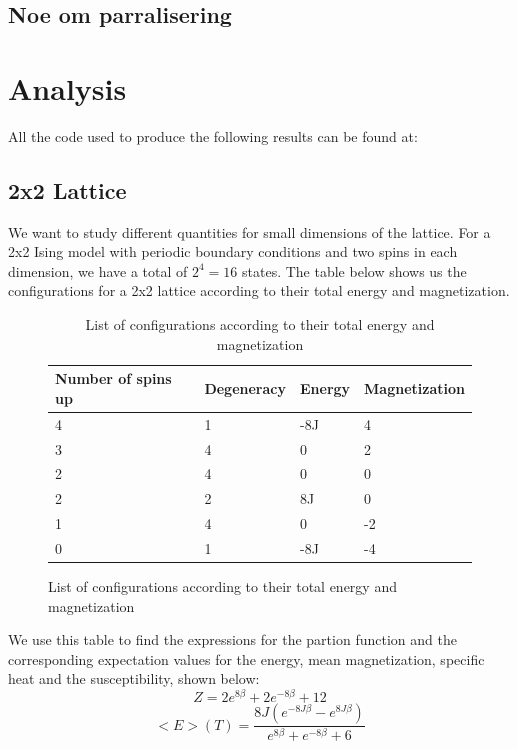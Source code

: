 \documentclass{article}
\begin{document}
\subsection*{Noe om parralisering}
\section*{Analysis}
All the code used to produce the following results can be found at:
\subsection*{2x2 Lattice}
We want to study different quantities for small dimensions of the lattice. For a 2x2 Ising model with periodic boundary conditions and two spins in each dimension, we have a total of $2^4 = 16$ states. The table below shows us the  configurations for a 2x2 lattice according to their total energy and magnetization.\newline \newline
\begin{figure}
\begin{table}
\centering
\label{my-label}
\begin{tabular}{|l|l|l|l|}
\hline
Number of spins up & Degeneracy & Energy & Magnetization \\ \hline
4                  & 1          & -8J    & 4             \\ \hline
3                  & 4          & 0      & 2             \\ \hline
2                  & 4          & 0      & 0             \\ \hline
2                  & 2          & 8J     & 0             \\ \hline
1                  & 4          & 0      & -2            \\ \hline
0                  & 1          & -8J    & -4            \\ \hline
\end{tabular}
\caption{List of configurations according to their total energy and magnetization}
\end{table}
\end{figure}
\newline \newline We use this table to find the expressions for the partion function and the corresponding expectation values for the energy, mean magnetization, specific heat and the susceptibility, shown below: 
$$Z = 2e^{8\beta} + 2e^{-8\beta} +12 $$
$$<E>(T) = \frac{8J(e^{-8J\beta}-e^{8J\beta})}{e^{8\beta} + e^{-8\beta} +6}$$
\end{document}
